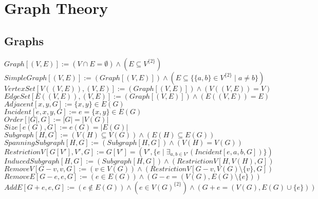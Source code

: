 \documentclass{book}
\newcommand{\abr}{:=}
\newcommand{\pr}[1]{\left(#1\right)}
\newcommand{\setbackgroundcolour}{\pagecolor[rgb]{0.2,0.2,0.2}}
\newcommand{\settextcolour}{\color[rgb]{0.8,0.8,0.8}}
\newcommand{\invertbackgroundtext}{\setbackgroundcolour\settextcolour}
\newcommand{\st}{\mathbin{|}}
\newcommand{\utup}[1]{\{#1\}}
\begin{document}
\invertbackgroundtext
\setlength{\parindent}{0pt}

\tableofcontents

\chapter{Graph Theory}
\section{Graphs}
$Graph[(V, E)] \abr (V \cap E = \emptyset) \land (E \subseteq V^{\{2\}})$ \\
$SimpleGraph[(V, E)] \abr \pr{Graph[(V, E)]} \land (E \subseteq \{\utup{a, b} \in V^{\{2\}} \st a \neq b\})$ \\
$VertexSet[V\pr{(V, E)}, (V, E)] \abr \pr{Graph[(V, E)]} \land \pr{V\pr{(V, E)} = V}$ \\
$EdgeSet[E\pr{(V, E)}, (V, E)] \abr \pr{Graph[(V, E)]} \land \pr{E\pr{(V, E)} = E}$ \\
$Adjacent[x, y, G] \abr \utup{x, y} \in E(G)$ \\
$Incident[e, x, y, G] \abr e = \utup{x, y} \in E(G)$ \\
$Order[|G|, G] \abr |G| = |V(G)|$ \\
$Size[e(G), G] \abr e(G) = |E(G)|$ \\

$Subgraph[H, G] \abr \pr{V(H) \subseteq V(G)} \land \pr{E(H) \subseteq E(G)}$ \\
$SpanningSubgraph[H, G] \abr (Subgraph[H, G]) \land \pr{V(H) = V(G)}$ \\
$RestrictionV[G[V'], V', G] \abr G[V'] = \pr{V', \{e \st \exists_{a, b \in V'}(Incident[e, a, b, G])\}}$ \\
$InducedSubgraph[H, G] \abr (Subgraph[H, G]) \land \pr{RestrictionV[H, V(H), G]}$ \\
$RemoveV[G - v, v, G] \abr \pr{v \in V(G)} \land \pr{RestrictionV[G - v, V(G) \setminus \{v\}, G]}$ \\
$RemoveE[G - e, e, G] \abr \pr{e \in E(G)} \land \pr{G - e = \pr{V(G), E(G) \setminus \{e\}}}$ \\
$AddE[G + e, e, G] \abr \pr{e \notin E(G)} \land \pr{e \in V(G)^{\{2\}}} \land \pr{G + e = \pr{V(G), E(G) \cup \{e\}}}$ \\
\end{document}
